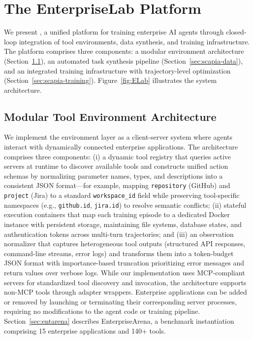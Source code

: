 \documentclass{article}
\theoremstyle{plain}
\theoremstyle{definition}
\theoremstyle{remark}
\begin{document}
\vspace{-0.2cm}
\section{The EnterpriseLab Platform}
\vspace{-0.2cm}
We present \name{}, a unified platform for training enterprise AI agents through closed-loop integration of tool environments, data synthesis, and training infrastructure. The platform comprises three components: a modular environment architecture (Section~\ref{sec:modular_env}), an automated task synthesis pipeline (Section~\ref{sec:scapia-data}), and an integrated training infrastructure with trajectory-level optimization (Section~\ref{sec:scapia-training}). Figure~\ref{fig:ELab} illustrates the system architecture.


\vspace{-0.2cm}
\subsection{Modular Tool Environment Architecture}
\label{sec:modular_env}
\vspace{-0.2cm}
We implement the environment layer as a client-server system where agents interact with dynamically connected enterprise applications. The architecture comprises three components: (i) a dynamic tool registry that queries active servers at runtime to discover available tools and constructs unified action schemas by normalizing parameter names, types, and descriptions into a consistent JSON format—for example, mapping \texttt{repository} (GitHub) and \texttt{project} (Jira) to a standard \texttt{workspace\_id} field while preserving tool-specific namespaces (e.g., \texttt{github.id}, \texttt{jira.id}) to resolve semantic conflicts; (ii) stateful execution containers that map each training episode to a dedicated Docker instance with persistent storage, maintaining file systems, database states, and authentication tokens across multi-turn trajectories; and (iii) an observation normalizer that captures heterogeneous tool outputs (structured API responses, command-line streams, error logs) and transforms them into a token-budget JSON format with importance-based truncation prioritizing error messages and return values over verbose logs. While our implementation uses MCP-compliant servers for standardized tool discovery and invocation, the architecture supports non-MCP tools through adapter wrappers. Enterprise applications can be added or removed by launching or terminating their corresponding server processes, requiring no modifications to the agent code or training pipeline. Section~\ref{sec:entarena} describes EnterpriseArena, a benchmark instantiation comprising 15 enterprise applications and 140+ tools.
\end{document}
